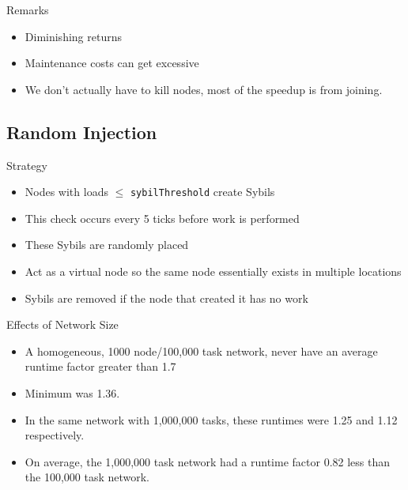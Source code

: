 \documentclass[11pt]{beamer}
\begin{document}
\begin{frame}{Remarks}
\begin{itemize}
	\item Diminishing returns
	\item Maintenance costs can get excessive
	\item We don't actually have to kill nodes, most of the speedup is from joining.
\end{itemize}
\end{frame}


\subsection{Random Injection}
\begin{frame}{Strategy}
	\begin{itemize}
		
		\item Nodes with loads $ \leq $ \texttt{sybilThreshold} create Sybils
		\item This check occurs every 5 ticks before work is performed
		\item These Sybils are randomly placed
		\item Act as a virtual node so the same node essentially exists in multiple locations
		\item Sybils are removed if the node that created it has no work
		
	\end{itemize}
\end{frame}


\begin{frame}{Effects of Network Size}
	\begin{itemize}
		\item A homogeneous, 1000 node/100,000 task network, never have an average runtime factor greater than 1.7
		\item Minimum was 1.36.
		\item In the same network with 1,000,000 tasks, these runtimes were 1.25 and 1.12 respectively.
		\item On average, the 1,000,000 task network had a runtime factor 0.82 less than the 100,000 task network.
	\end{itemize}
\end{frame}
\end{document}
